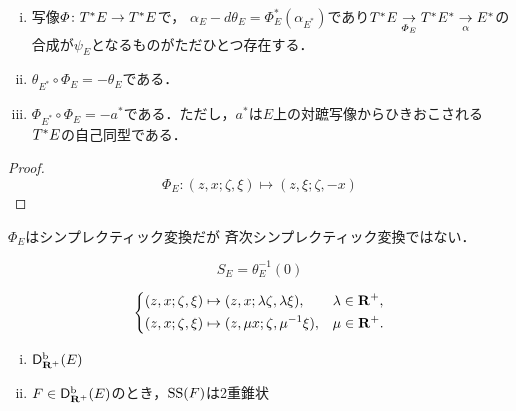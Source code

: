 \begin{leftbar}
\begin{PRP}\label{prp551}
    \begin{enumerate}[(i)]
        \item 写像\(\varPhi\colon \cotb[E]\to\cotb[E]\)で，
        \(
            \alpha_{E}-d\theta_{E}
            =\varPhi_{E}^{\ast}(\alpha_{E^{\ast}})
        \)であり\(
            \cotb[E]\underset{\varPhi_{E}}{\rightarrow}
            \cotb[E^{\ast}]\underset{\alpha}{\rightarrow}
            E^{\ast}
        \)の合成が\(\psi_{E}\)となるものがただひとつ存在する．
        \item \(\theta_{E^{\ast}}\circ\varPhi_{E}=-\theta_E\)である．
        \item \(\varPhi_{E^{\ast}}\circ \varPhi_{E}=-a^{\ast}\)である．ただし，\(a^{\ast}\)は\(E\)上の対蹠写像からひきおこされる\(\cotb[E]\)の自己同型である．
    \end{enumerate}
\end{PRP}
\end{leftbar}
    
\begin{proof}
    \begin{equation}
        \varPhi_{E}\colon (z,x;\zeta,\xi)\mapsto(z,\xi;\zeta,-x)
    \end{equation}
\end{proof}

\begin{RMK}\label{rmk552}
    \(\varPhi_{E}\)はシンプレクティック変換だが
    斉次シンプレクティック変換ではない．
\end{RMK}

\begin{equation}
    S_{E}=\theta_{E}^{-1}(0)
\end{equation}

\begin{equation}
    \begin{dcases}
        (z,x;\zeta,\xi)\mapsto (z,x;\lambda\zeta,\lambda\xi),& \lambda\in\rrp,\\
        (z,x;\zeta,\xi)\mapsto (z,\mu x;\zeta,\mu^{-1}\xi),& \mu\in\rrp.
    \end{dcases}
\end{equation}

\begin{leftbar}
\begin{PRP}\label{prp553}
    \begin{enumerate}[(i)]
        \item \(\Dbconic(E)\)
        \item \(F\in\Dbconic(E)\)のとき，\(\muS(F)\)は2重錐状
    \end{enumerate}
\end{PRP}
\end{leftbar}
    
